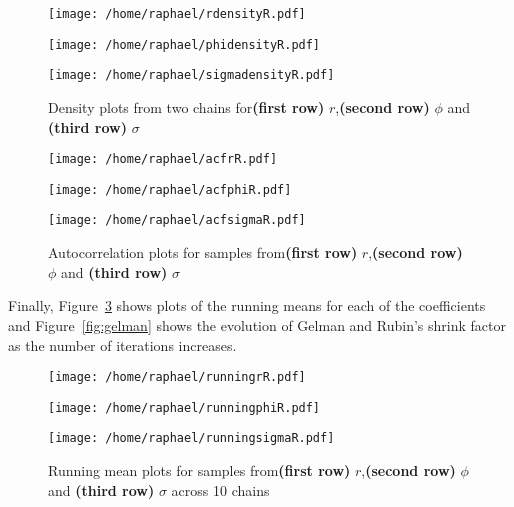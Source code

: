 \documentclass{article}
\begin{document}
	\begin{figure}[htb]
		\centering
		\begin{minipage}{0.6\textwidth}
			\centering
			\texttt{[image: /home/raphael/rdensityR.pdf]}
		\end{minipage}
		\begin{minipage}{0.6\textwidth}
			\centering
			\texttt{[image: /home/raphael/phidensityR.pdf]}
		\end{minipage}
		\begin{minipage}{0.6\textwidth}
			\centering
			\texttt{[image: /home/raphael/sigmadensityR.pdf]}
		\end{minipage}
		\caption{Density plots from two chains for\textbf{(first row)} $r$,\textbf{(second row)} $\phi$ and \textbf{(third row)} $\sigma$}
		\label{fig:densities}
	\end{figure}
	
	\begin{figure}[htb]
		\centering
		\begin{minipage}{0.6\textwidth}
			\centering
			\texttt{[image: /home/raphael/acfrR.pdf]}
		\end{minipage}
		\begin{minipage}{0.6\textwidth}
			\centering
			\texttt{[image: /home/raphael/acfphiR.pdf]}
		\end{minipage}
		\begin{minipage}{0.6\textwidth}
			\centering
			\texttt{[image: /home/raphael/acfsigmaR.pdf]}
		\end{minipage}
		\caption{Autocorrelation plots for samples from\textbf{(first row)} $r$,\textbf{(second row)} $\phi$ and \textbf{(third row)} $\sigma$}
		\label{fig:acf}
	\end{figure}

Finally, Figure~\ref{fig:running} shows plots of the running means for each of the coefficients and Figure~\ref{fig:gelman} shows the evolution of Gelman and Rubin's shrink factor as the number of iterations increases.

	\begin{figure}[htb]
		\centering
		\begin{minipage}{0.6\textwidth}
			\centering
			\texttt{[image: /home/raphael/runningrR.pdf]}
		\end{minipage}
		\begin{minipage}{0.6\textwidth}
			\centering
			\texttt{[image: /home/raphael/runningphiR.pdf]}
		\end{minipage}
		\begin{minipage}{0.6\textwidth}
			\centering
			\texttt{[image: /home/raphael/runningsigmaR.pdf]}
		\end{minipage}
		\caption{Running mean plots for samples from\textbf{(first row)} $r$,\textbf{(second row)} $\phi$ and \textbf{(third row)} $\sigma$ across 10 chains}
		\label{fig:running}
	\end{figure}
	
\end{document}
